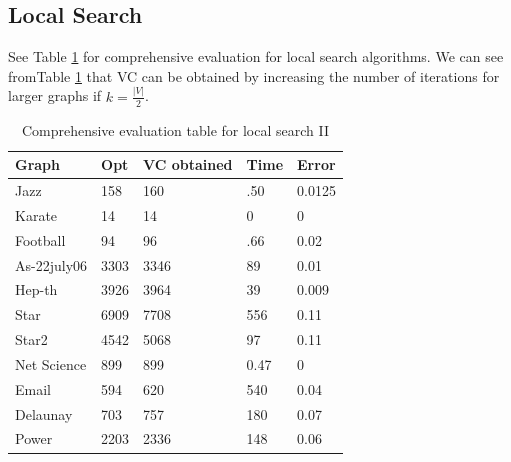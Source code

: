 \subsection{Local Search}
See Table \ref{tab2} for comprehensive evaluation for local search algorithms. We can see fromTable \ref{tab2} that VC can be obtained by increasing the number of iterations for larger graphs if $k=\frac{\left| V \right|}{2}$.
\begin{table}[htb]
\caption{Comprehensive evaluation table for local search II}
\label{tab2}
\begin{minipage}{\columnwidth}
\begin{center}
\begin{tabular}{@{}lllll@{}}
\toprule
Graph       & Opt  & VC obtained & Time & Error  \\ \midrule
Jazz        & 158  & 160         & .50  & 0.0125 \\
Karate      & 14   & 14          & 0    & 0      \\
Football    & 94   & 96          & .66  & 0.02   \\
As-22july06 & 3303 & 3346        & 89   & 0.01   \\
Hep-th      & 3926 & 3964        & 39   & 0.009  \\
Star        & 6909 & 7708        & 556  & 0.11   \\
Star2       & 4542 & 5068        & 97   & 0.11   \\
Net Science & 899  & 899         & 0.47 & 0      \\
Email       & 594  & 620         & 540  & 0.04   \\
Delaunay    & 703  & 757         & 180  & 0.07   \\
Power       & 2203 & 2336        & 148  & 0.06   \\ \bottomrule
\end{tabular}
\end{center}
\end{minipage}
\end{table}

